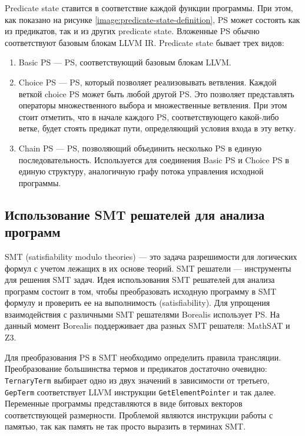 Predicate state ставится в соответствие каждой функции программы. При этом, как показано на рисунке \ref{image:predicate-state-definition}, PS может состоять как из предикатов, так и из других predicate state. Вложенные PS обычно соответствуют базовым блокам LLVM IR. Predicate state бывает трех видов:
\begin{enumerate}
\item Basic PS --- PS, соответствующий базовым блокам LLVM.
\item Choice PS --- PS, который позволяет реализовывать ветвления. Каждой веткой choice PS может быть любой другой PS. Это позволяет представлять операторы множественного выбора и множественные ветвления. При этом стоит отметить, что в начале каждого PS, соответствующего какой-либо ветке, будет стоять предикат пути, определяющий условия входа в эту ветку.
\item Chain PS --- PS, позволяющий объединить несколько PS в единую последовательность. Используется для соединения Basic PS и Choice PS в единую структуру, аналогичную графу потока управления исходной программы.
\end{enumerate}

\subsection{Использование SMT решателей для анализа программ}
SMT (satisfiability modulo theories) --- это задача разрешимости для логических формул с учетом лежащих в их основе теорий\cite{smt}. SMT решатели --- инструменты для решения SMT задач. Идея использования SMT решателей для анализа программ состоит в том, чтобы преобразовать исходную программу в SMT формулу и проверить ее на выполнимость (satisfiability). Для упрощения взаимодействия с различными SMT решателями Borealis использует PS. На данный момент Borealis поддерживает два разных SMT решателя: MathSAT\cite{mathsatsolver} и Z3\cite{z3solver}. 

Для преобразования PS в SMT необходимо определить правила трансляции. Преобразование большинства термов и предикатов достаточно очевидно: \texttt{TernaryTerm} выбирает одно из двух значений в зависимости от третьего, \texttt{GepTerm} соответствует LLVM инструкции \texttt{GetElementPointer} и так далее. Переменные программы представляются в виде битовых векторов соответствующей размерности. Проблемой являются инструкции работы с памятью, так как память не так просто выразить в терминах SMT.

